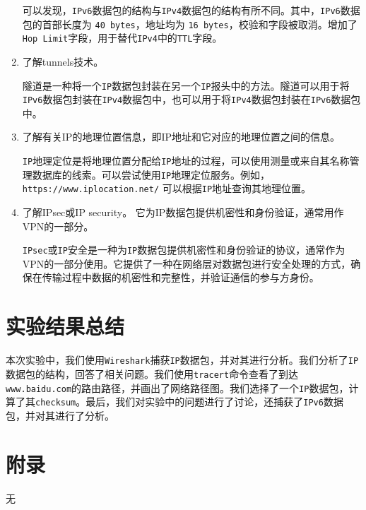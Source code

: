 \documentclass{article}
\begin{document}
\begin{enumerate}[noitemsep]
        可以发现，\texttt{IPv6}数据包的结构与\texttt{IPv4}数据包的结构有所不同。其中，\texttt{IPv6}数据包的首部长度为 \texttt{40 bytes}，地址均为 \texttt{16 bytes}，校验和字段被取消。增加了 \texttt{Hop Limit}字段，用于替代\texttt{IPv4}中的\texttt{TTL}字段。

  \item 了解tunnels技术。

        隧道是一种将一个\texttt{IP}数据包封装在另一个\texttt{IP}报头中的方法。隧道可以用于将\texttt{IPv6}数据包封装在\texttt{IPv4}数据包中，也可以用于将\texttt{IPv4}数据包封装在\texttt{IPv6}数据包中。

  \item 了解有关IP的地理位置信息，即IP地址和它对应的地理位置之间的信息。

        \texttt{IP}地理定位是将地理位置分配给\texttt{IP}地址的过程，可以使用测量或来自其名称管理数据库的线索。可以尝试使用\texttt{IP}地理定位服务。例如，\texttt{https://www.iplocation.net/} 可以根据\texttt{IP}地址查询其地理位置。

  \item 了解IPsec或IP security。 它为IP数据包提供机密性和身份验证，通常用作VPN的一部分。

        \texttt{IPsec}或\texttt{IP}安全是一种为\texttt{IP}数据包提供机密性和身份验证的协议，通常作为VPN的一部分使用。它提供了一种在网络层对数据包进行安全处理的方式，确保在传输过程中数据的机密性和完整性，并验证通信的参与方身份。
\end{enumerate}

\section{实验结果总结}

本次实验中，我们使用\texttt{Wireshark}捕获\texttt{IP}数据包，并对其进行分析。我们分析了\texttt{IP}数据包的结构，回答了相关问题。我们使用\texttt{tracert}命令查看了到达\texttt{www.baidu.com}的路由路径，并画出了网络路径图。我们选择了一个\texttt{IP}数据包，计算了其\texttt{checksum}。最后，我们对实验中的问题进行了讨论，还捕获了\texttt{IPv6}数据包，并对其进行了分析。

\section{附录}

无
\end{document}
